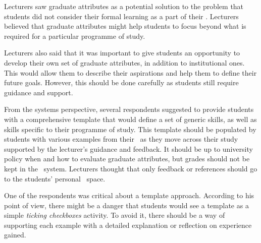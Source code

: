 
Lecturers saw graduate attributes as a potential solution to the problem that
students did not consider their formal learning as a part of their \LLLsn.
Lecturers believed that graduate attributes might help students to focus beyond
what is required for a particular programme of study.

Lecturers also said that it was important to give students an opportunity to
develop their own set of graduate attributes, in addition to institutional ones.
This would allow them to describe their aspirations and help them to define
their future goals. However, this should be done carefully as students still
require guidance and support.


From the systems perspective, several respondents suggested to provide students
with a comprehensive template that would define a set of generic \LLLs skills,
as well as skills specific to their programme of study. This template should be
populated by students with various examples from their \ep~as they move across
their study supported by the lecturer's guidance and feedback. It should be up
to university policy when and how to evaluate graduate attributes, but grades
should not be kept in the \ep~system. Lecturers thought that only feedback or
references should go to the students' personal \ep~space.

One of the respondents was critical about a template approach. According to his
point of view, there might be a danger that students would see a template as a
simple \textit{ticking checkboxes} activity. To avoid it, there should be a way
of supporting each example with a detailed explanation or reflection on
experience gained.

